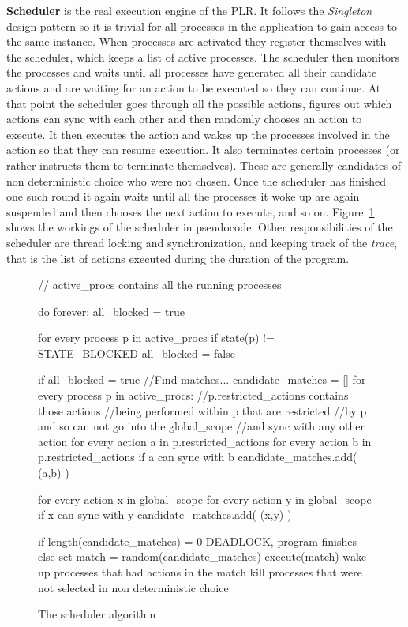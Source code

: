 	\textbf{Scheduler} is the real execution engine of the PLR. It follows the
	\textit{Singleton} \cite{design_patterns} design pattern so it is trivial 
	for all	processes in the application to gain access to the same 
	 instance. When processes are activated they register 
	themselves with the scheduler, which keeps a list of active processes. The 
	scheduler then monitors the processes and waits until all processes have 
	generated all their candidate actions and are waiting for an action to be 
	executed so they can continue. At that point the scheduler goes through all 
	the possible actions, figures out which actions can sync with each other and 
	then randomly chooses an action to execute. It then executes the action and 
	wakes up the processes involved in the action so that they can resume 
	execution. It also terminates certain processes (or rather instructs them to 
	terminate themselves). These are generally candidates of non deterministic 
	choice who were not chosen. Once the scheduler has finished one such round 
	it again waits until all the processes it woke up are again suspended and 
	then chooses the next action to execute, and so on. 
	Figure~\ref{fig:scheduler} shows the workings of the scheduler in 
	pseudocode. Other responsibilities of the scheduler are thread locking and 
	synchronization, and keeping track of the \textit{trace}, that is the list 
	of actions executed during the duration of the program.
	 
	\begin{figure}
	\begin{codeblock}
// active_procs contains all the running processes

do forever:
  all_blocked = true
  
  for every process p in active_procs
    if state(p) != STATE_BLOCKED
      all_blocked = false
    
  if all_blocked = true
    //Find matches...      
    candidate_matches = []
    for every process p in active_procs:
      //p.restricted_actions contains those actions
      //being performed within p that are restricted 
      //by p and so can not go into the global_scope 
      //and sync with any other action
      for every action a in p.restricted_actions
        for every action b in p.restricted_actions
          if a can sync with b
            candidate_matches.add( (a,b) )
		
    for every action x in global_scope
      for every action y in global_scope
        if x can sync with y
          candidate_matches.add( (x,y) )
    
    if length(candidate_matches) = 0
    	DEADLOCK, program finishes
    else
      set match = random(candidate_matches)
      execute(match)
      wake up processes that had actions in the match
      kill processes that were not selected 
        in non deterministic choice
	
	\end{codeblock}
	\caption{The scheduler algorithm}
	\label{fig:scheduler}
	\end{figure}
	

